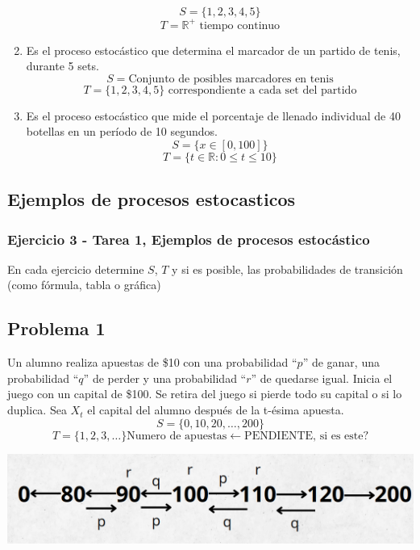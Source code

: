 \documentclass{article}
\begin{document}
\begin{enumerate}
          \[ S = \{1,2,3,4,5\} \]
          \[ T = \mathbb{R}^+ \text{ tiempo continuo} \]
    \item Es el proceso estocástico que determina el marcador de un partido de tenis, durante 5 sets.
          \[ S = \text{Conjunto de posibles marcadores en tenis} \]
          \[ T = \{1,2,3,4,5\} \text{ correspondiente a cada set del partido} \]
    \item Es el proceso estocástico que mide el porcentaje de llenado individual de 40 botellas en un período de 10 segundos.
          \[ S = \{x \in [0, 100]\} \]
          \[ T = \{t \in \mathbb{R} : 0 \leq t \leq 10\} \]
\end{enumerate}

\subsection{Ejemplos de procesos estocasticos}

\subsubsection{Ejercicio 3 - Tarea 1, Ejemplos de procesos estocástico}

En cada ejercicio determine \( S \), \( T \) y si es posible, las probabilidades de transición (como fórmula, tabla o gráfica)

\subsection*{Problema 1}
Un alumno realiza apuestas de \$10 con una probabilidad ``\( p \)'' de ganar, una probabilidad ``\( q \)'' de perder y una probabilidad ``\( r \)'' de quedarse igual. Inicia el juego con un capital de \$100. Se retira del juego si pierde todo su capital o si lo duplica. Sea \( X_t \) el capital del alumno después de la t-ésima apuesta.
\[ S = \{0, 10, 20, \dots, 200\} \]
\[ T = \{1,2,3,\dots\} \text{Numero de apuestas} \leftarrow \text{PENDIENTE, si es este?}\]
\begin{center}
    \includegraphics[width=0.6\linewidth]{./imagenes/image.png}
\end{center}
\end{document}
